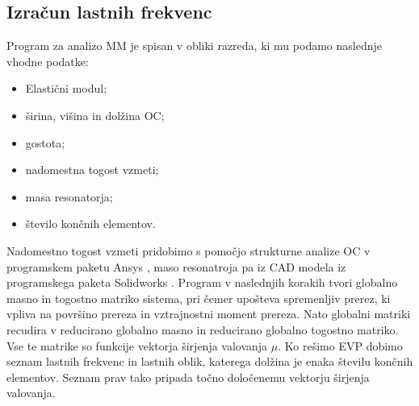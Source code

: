 \documentclass[12pt]{report}
\begin{document}
\subsection{Izračun lastnih frekvenc}
Program za analizo \ac{MM} je spisan v obliki razreda, ki mu podamo naslednje vhodne podatke:
\begin{itemize}
  \item Elastični modul;
  \item širina, višina in dolžina \ac{OC};
  \item gostota;
  \item nadomestna togost vzmeti;
  \item masa resonatorja;
  \item število končnih elementov.
\end{itemize}
Nadomestno togost vzmeti pridobimo s pomočjo strukturne analize \ac{OC} v programskem paketu Ansys \cite{ansys}, maso resonatroja pa iz CAD modela iz programskega paketa Solidworks \cite{solidworks}. Program v naslednjih korakih tvori globalno masno in togostno matriko
sistema, pri čemer upošteva spremenljiv prerez, ki vpliva na površino prereza in vztrajnostni moment prereza. Nato globalni matriki recudira v reducirano globalno masno in reducirano globalno
togostno matriko. Vse te matrike so funkcije vektorja širjenja valovanja $\mu$. Ko rešimo \ac{EVP} dobimo seznam lastnih frekvenc in lastnih oblik, katerega dolžina je enaka številu končnih elementov. Seznam prav tako pripada točno določenemu vektorju širjenja valovanja.
\end{document}
